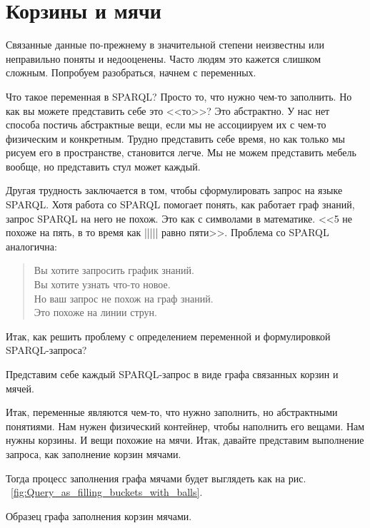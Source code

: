 \chapter{Корзины и мячи}
\label{ch:BucketsAndBalls}

Связанные данные по-прежнему в значительной степени неизвестны или неправильно поняты и недооценены. Часто людям это кажется слишком сложным. 
Попробуем разобраться, начнем с переменных.

Что такое переменная в SPARQL? Просто то, что нужно чем-то заполнить. Но как вы можете представить себе это <<то>>? Это абстрактно. У нас нет способа постичь абстрактные вещи, если мы не ассоциируем их с чем-то физическим и конкретным. Трудно представить себе время, но как только мы рисуем его в пространстве, становится легче. Мы не можем представить мебель вообще, но представить стул может каждый.

Другая трудность заключается в том, чтобы сформулировать запрос на языке SPARQL. Хотя работа со SPARQL помогает понять, как работает граф знаний, запрос SPARQL на него не похож. Это как с символами в математике. <<5 не похоже на пять, в то время как ||||| равно пяти>>. Проблема со SPARQL аналогична:

\begin{quote}
Вы хотите запросить график знаний.\\
Вы хотите узнать что-то новое.\\
Но ваш запрос не похож на граф знаний.\\
Это похоже на линии струн.\\
\end{quote}

Итак, как решить проблему с определением переменной и формулировкой SPARQL-запроса?

Представим себе каждый SPARQL-запрос в виде графа связанных корзин и мячей.

Итак, переменные являются чем-то, что нужно заполнить, но абстрактными понятиями. Нам нужен физический контейнер, чтобы наполнить его вещами. Нам нужны корзины. И вещи похожие на мячи. Итак, давайте представим выполнение запроса, как заполнение корзин мячами.

Тогда процесс заполнения графа мячами будет выглядеть как на рис. ~\ref{fig:Query_as_filling_buckets_with_balls}.

\begin{marginfigure}[-1.5cm]
	{
		\setlength{\fboxsep}{0pt}%
		\setlength{\fboxrule}{1pt}%
	}
    \caption{Образец графа заполнения корзин мячами.}
	\label{fig:Query_as_filling_buckets_with_balls}
\end{marginfigure}

